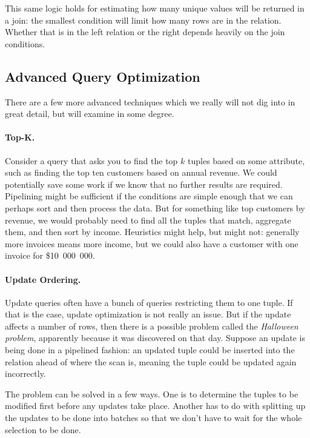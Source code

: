 \documentclass[a4paper]{report}
\begin{document}
This same logic holds for estimating how many unique values will be returned in a join: the smallest condition will limit how many rows are in the relation. Whether that is in the left relation or the right depends heavily on the join conditions. 

\subsection*{Advanced Query Optimization}

There are a few more advanced techniques which we really will not dig into in great detail, but will examine in some degree. 

\paragraph{Top-K.} Consider a query that asks you to find the top $k$ tuples based on some attribute, such as finding the top ten customers based on annual revenue. We could potentially save some work if we know that no further results are required. Pipelining might be sufficient if the conditions are simple enough that we can perhaps sort and then process the data. But for something like top customers by revenue, we would probably need to find all the tuples that match, aggregate them, and then sort by income. Heuristics might help, but might not: generally more invoices means more income, but we could also have a customer with one invoice for \$10~000~000. 

\paragraph{Update Ordering.} 

Update queries often have a bunch of queries restricting them to one tuple. If that is the case, update optimization is not really an issue. But if the update affects a number of rows, then there is a possible problem called the \textit{Halloween problem}, apparently because it was discovered on that day. Suppose an update is being done in a pipelined fashion: an updated tuple could be inserted into the relation ahead of where the scan is, meaning the tuple could be updated again incorrectly. 

The problem can be solved in a few ways. One is to determine the tuples to be modified first before any updates take place. Another has to do with splitting up the updates to be done into batches so that we don't have to wait for the whole selection to be done.
\end{document}
